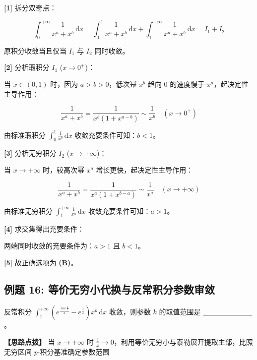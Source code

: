 \documentclass[11pt,a4paper,UTF8]{ctexart}
\begin{document}
\begin{solbox}[分步推导与答题规范]
\textbf{[1]} 拆分双奇点：


\begin{equation*}
\int_0^{+\infty} \frac{1}{x^a + x^b}\,\mathrm{d}x = \int_0^1 \frac{1}{x^a + x^b}\,\mathrm{d}x + \int_1^{+\infty} \frac{1}{x^a + x^b}\,\mathrm{d}x = I_1 + I_2
\end{equation*}


原积分收敛当且仅当 $I_1$ 与 $I_2$ 同时收敛。

\textbf{[2]} 分析瑕积分 $I_1$ ($x \to 0^+$)：

当 $x \in (0, 1)$ 时，因为 $a > b > 0$，低次幂 $x^b$ 趋向 0 的速度慢于 $x^a$，起决定性主导作用：


\begin{equation*}
\frac{1}{x^a + x^b} = \frac{1}{x^b(1 + x^{a-b})} \sim \frac{1}{x^b} \quad (x \to 0^+)
\end{equation*}


由标准瑕积分 $\int_0^1 \frac{1}{x^b}\,\mathrm{d}x$ 收敛充要条件可知：$b < 1$。

\textbf{[3]} 分析无穷积分 $I_2$ ($x \to +\infty$)：

当 $x \to +\infty$ 时，较高次幂 $x^a$ 增长更快，起决定性主导作用：


\begin{equation*}
\frac{1}{x^a + x^b} = \frac{1}{x^a(1 + x^{b-a})} \sim \frac{1}{x^a} \quad (x \to +\infty)
\end{equation*}


由标准无穷积分 $\int_1^{+\infty} \frac{1}{x^a}\,\mathrm{d}x$ 收敛充要条件可知：$a > 1$。

\textbf{[4]} 求交集得出充要条件：

两端同时收敛的充要条件为：$a > 1$ 且 $b < 1$。

\textbf{[5]} 故正确选项为 \textbf{(B)}。
\end{solbox}


\subsection{例题 16: 等价无穷小代换与反常积分参数审敛}

反常积分 $\int_1^{+\infty} \left( e^{\frac{\cos\frac{1}{x}}{x}} - e^{\frac{1}{x}} \right) x^k\,\mathrm{d}x$ 收敛，则参数 $k$ 的取值范围是 $\underline{\hspace{2.5cm}}$。

\textbf{\color{DeepPurple}【思路点拨】} 当 $x \to +\infty$ 时 $\frac{1}{x} \to 0$，利用等价无穷小与泰勒展开提取主部，比照无穷区间 $p$-积分基准确定参数范围
\end{document}
